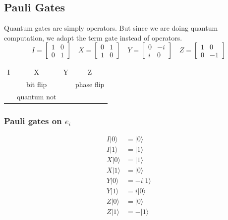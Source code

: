 \documentclass[14pt]{extarticle}
\begin{document}
\subsection{Pauli Gates}
Quantum gates are simply operators. But since we are doing quantum computation, we adapt the term gate instead of operators.
\[
I = \begin{bmatrix} 1 & 0 \\ 0 & 1 \end{bmatrix} \quad
X = \begin{bmatrix} 0 & 1 \\ 1 & 0 \end{bmatrix} \quad
Y = \begin{bmatrix} 0 & -i \\ i & 0 \end{bmatrix} \quad
Z = \begin{bmatrix} 1 & 0 \\ 0 & -1 \end{bmatrix}
\]
\begin{center}
\begin{tabular}{cccc}
I & X & Y & Z \\
& bit flip    &   & phase flip \\
& quantum not &   &            \\
\end{tabular}
\end{center}


\subsubsection{Pauli gates on $e_i$}
\begin{align*}
I |0\rangle &= |0\rangle \\
I |1\rangle &= |1\rangle \\
X |0\rangle &= |1\rangle \\
X |1\rangle &= |0\rangle \\
Y |0\rangle &= -i |1\rangle \\
Y |1\rangle &= i |0\rangle \\
Z |0\rangle &= |0\rangle \\
Z |1\rangle &= -|1\rangle \\
\end{align*}
\end{document}
